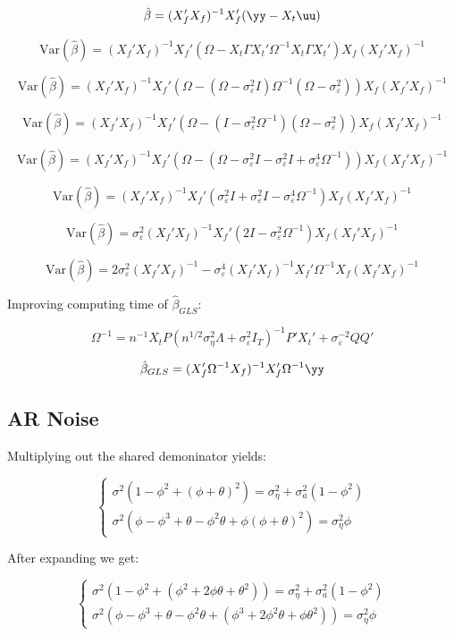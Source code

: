 

$$ \hat{\beta} = (X_f'X_f)^{-1}X_f'(\yy - X_t\uu)  $$

$$ \text{Var}(\hat{\beta}) = (X_f'X_f)^{-1}X_f'(\Omega - X_t\Gamma X_t'\Omega^{-1}X_t\Gamma X_t')X_f(X_f'X_f)^{-1} $$

$$ \text{Var}(\hat{\beta}) = (X_f'X_f)^{-1}X_f'(\Omega - (\Omega - \sigma_\varepsilon^2I)\Omega^{-1}(\Omega - \sigma_\varepsilon^2))X_f(X_f'X_f)^{-1} $$

$$ \text{Var}(\hat{\beta}) = (X_f'X_f)^{-1}X_f'(\Omega - (I - \sigma_\varepsilon^2\Omega^{-1})(\Omega - \sigma_\varepsilon^2))X_f(X_f'X_f)^{-1} $$

$$ \text{Var}(\hat{\beta}) = (X_f'X_f)^{-1}X_f'(\Omega - (\Omega - \sigma_\varepsilon^2I - \sigma_\varepsilon^2I + \sigma_\varepsilon^4\Omega^{-1}))X_f(X_f'X_f)^{-1} $$

$$ \text{Var}(\hat{\beta}) = (X_f'X_f)^{-1}X_f'( \sigma_\varepsilon^2I + \sigma_\varepsilon^2I - \sigma_\varepsilon^4\Omega^{-1})X_f(X_f'X_f)^{-1} $$

$$ \text{Var}(\hat{\beta}) = \sigma_\varepsilon^2(X_f'X_f)^{-1}X_f' (2I - \sigma_\varepsilon^2\Omega^{-1})X_f(X_f'X_f)^{-1} $$

$$ \text{Var}(\hat{\beta}) = 2\sigma_\varepsilon^2(X_f'X_f)^{-1}  - \sigma_\varepsilon^4(X_f'X_f)^{-1}X_f'\Omega^{-1}X_f(X_f'X_f)^{-1} $$


Improving computing time of $\hat{\beta}_{GLS}$:

$$\Omega^{-1} =  
   n^{-1} X_t P (n^{1/2}\sigma_\eta^2\Lambda + \sigma_\varepsilon^2I_T)^{-1}P'X_t' + \sigma_\varepsilon^{-2}Q
   Q'$$

  $$\hat{\beta}_{GLS} = (X_f'\Omega^{-1}X_f)^{-1} X_f'\Omega^{-1}\yy$$

\subsection{AR Noise }

Multiplying out the shared demoninator yields:

$$\begin{cases}
    \sigma^2(1 - \phi ^ 2 + (\phi + \theta)^2) =  \sigma_\eta^2 + \sigma_a^2(1 - \phi ^ 2) \\
    \sigma^2(\phi - \phi^3 + \theta - \phi^2\theta + \phi(\phi + \theta)^2) = \sigma_\eta^2\phi
\end{cases} $$

After expanding we get:

$$\begin{cases}
    \sigma^2(1 - \phi ^ 2 + (\phi^2 + 2\phi\theta + \theta^2)) =  \sigma_\eta^2 + \sigma_a^2(1 - \phi ^ 2) \\
    \sigma^2(\phi - \phi^3 + \theta - \phi^2\theta + (\phi^3 + 2\phi^2\theta + \phi\theta^2)) = \sigma_\eta^2\phi
\end{cases} $$

